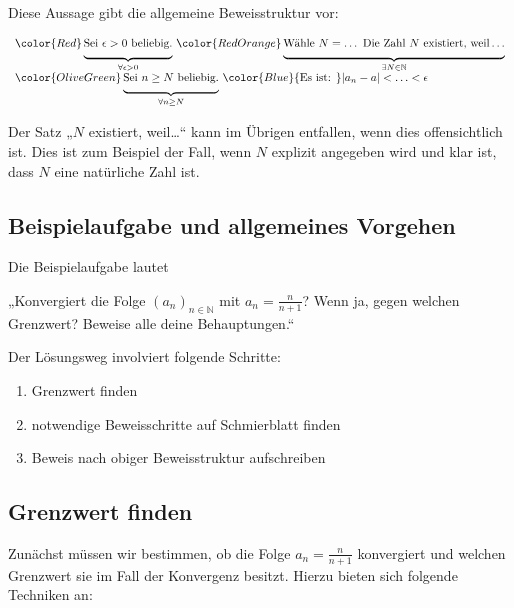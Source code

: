 \documentclass[fontsize=9pt,
               parskip=half-,
               DIV=14,
               listof=chapterentry,
               tocflat]{scrbook}
\begin{document}
Diese Aussage gibt die allgemeine Beweisstruktur vor:

\begin{align*}
{\begin{array}{l}{\color {Red}\underbrace {{\underset {}{}}{\text{Sei }}\epsilon >0{\text{ beliebig.}}} _{\forall \epsilon >0}}\ {\color {RedOrange}\underbrace {{\underset {}{}}{\text{Wähle }}N=\ldots {\text{ Die Zahl }}N{\text{ existiert, weil}}\ldots } _{\exists N\in \mathbb {N} }}\\{\color {OliveGreen}\underbrace {{\underset {}{}}{\text{Sei }}n\geq N{\text{ beliebig.}}} _{\forall n\geq N}}\ {\color {Blue}{\text{Es ist: }}|a_{n}-a|<\ldots <\epsilon }\end{array}}
\end{align*}

Der Satz „$N$ existiert, weil…“ kann im Übrigen entfallen, wenn dies offensichtlich ist. Dies ist zum Beispiel der Fall, wenn $N$ explizit angegeben wird und klar ist, dass $N$ eine natürliche Zahl ist.

\subsection{Beispielaufgabe und allgemeines Vorgehen}

Die Beispielaufgabe lautet

\begin{importantparagraph*}
„Konvergiert die Folge $(a_{n})_{n\in \mathbb {N} }$ mit $a_{n}={\tfrac {n}{n+1}}$? Wenn ja, gegen welchen Grenzwert? Beweise alle deine Behauptungen.“

\end{importantparagraph*}

Der Lösungsweg involviert folgende Schritte:

\begin{enumerate}
\item Grenzwert finden
\item notwendige Beweisschritte auf Schmierblatt finden
\item Beweis nach obiger Beweisstruktur aufschreiben
\end{enumerate}

\subsection{Grenzwert finden}

Zunächst müssen wir bestimmen, ob die Folge $a_{n}={\tfrac {n}{n+1}}$ konvergiert und welchen Grenzwert sie im Fall der Konvergenz besitzt. Hierzu bieten sich folgende Techniken an:
\end{document}
